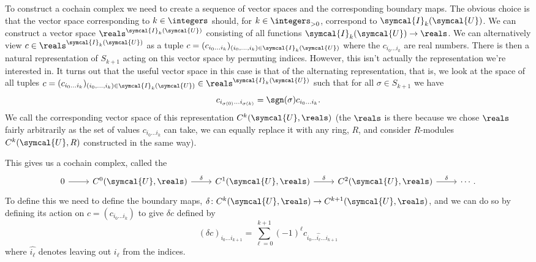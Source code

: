\documentclass[fleqn]{NotesClass}
\newcommand{\openCover}{\symcal{U}}
\begin{document}
    To construct a cochain complex we need to create a sequence of vector spaces and the corresponding boundary maps.
    The obvious choice is that the vector space corresponding to \(k \in \integers\) should, for \(k \in \integers_{> 0}\), correspond to \(\symcal{I}_k(\openCover)\).
    We can construct a vector space \(\reals^{\symcal{I}_k(\openCover)}\) consisting of all functions \(\symcal{I}_k(\openCover) \to \reals\).
    We can alternatively view \(c \in \reals^{\symcal{I}_k(\openCover)}\) as a tuple \(c = (c_{i_0 \dotso i_k})_{(i_0, \dotsc, i_k) \in \symcal{I}_k(\openCover)}\) where the \(c_{i_0\dotso i_k}\) are real numbers.
    There is then a natural representation of \(S_{k+1}\) acting on this vector space by permuting indices.
    However, this isn't actually the representation we're interested in.
    It turns out that the useful vector space in this case is that of the alternating representation, that is, we look at the space of all tuples \(c = (c_{i_0 \dotso i_k})_{(i_0, \dotsc, i_k) \in \symcal{I}_k(\openCover)} \in \reals^{\symcal{I}_k(\openCover)}\) such that for all \(\sigma \in S_{k+1}\) we have
    \begin{equation}
        c_{i_{\sigma(0)} \dotso i_{\sigma(k)}} = \sgn(\sigma) c_{i_0 \dotso i_k}.
    \end{equation}
    We call the corresponding vector space of this representation \(C^k(\openCover, \reals)\) (the \(\reals\) is there because we chose \(\reals\) fairly arbitrarily as the set of values \(c_{i_0\dotso i_k}\) can take, we can equally replace it with any ring, \(R\), and consider \(R\)-modules \(C^k(\openCover, R)\) constructed in the same way).
    
    This gives us a cochain complex, called the 
    \begin{equation}
        \begin{tikzcd}
            0 \arrow[r] & C^0(\openCover, \reals) \arrow[r, "\delta"] & C^1(\openCover, \reals) \arrow[r, "\delta"] & C^2(\openCover, \reals) \arrow[r, "\delta"] & \dotsb.
        \end{tikzcd}
    \end{equation}
    To define this we need to define the boundary maps, \(\delta \colon C^k(\openCover, \reals) \to C^{k+1}(\openCover, \reals)\), and we can do so by defining its action on \(c = (c_{i_0\dotso i_k})\) to give \(\delta c\) defined by
    \begin{equation}
        (\delta c)_{i_0 \dotso i_{k+1}} = \sum_{\ell = 0}^{k + 1} (-1)^{\ell} c_{i_0 \dotso \widehat{i_\ell} \dotso i_{k+1}}
    \end{equation}
    where \(\widehat{i_\ell}\) denotes leaving out \(i_\ell\) from the indices.
    
\end{document}
